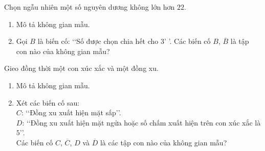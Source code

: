 \begin{bt}%
	Chọn ngẫu nhiên một số nguyên dương không lớn hơn $ 22 $. 
	\begin{enumerate}
		\item Mô tả không gian mẫu.
		\item Gọi $ B $ là biến cố: \lq \lq Số được chọn chia hết cho $ 3 $\rq 
		\rq . Các biến cố $ B $, $ \overline{B} $ là tập con nào của không gian 
		mẫu?
	\end{enumerate}
	
\end{bt}

\begin{bt}%
	Gieo đồng thời một con xúc xắc và một đồng xu. 
	\begin{enumerate}
		\item Mô tả không gian mẫu.
		\item Xét các biến cố sau:\\ 
		$ C $: \lq \lq  Đồng xu xuất hiện mặt sấp\rq \rq .\\
		$ D $: \lq \lq Đồng xu xuất hiện mặt ngửa hoặc số chấm xuất hiện trên 
		con xúc xắc là $ 5 $\rq \rq . \\
		Các biến cố $ C $, $ \overline{C} $, $ D $ và $ \overline{D} $ là các 
		tập con nào của không gian mẫu?
	\end{enumerate}
\end{bt}

